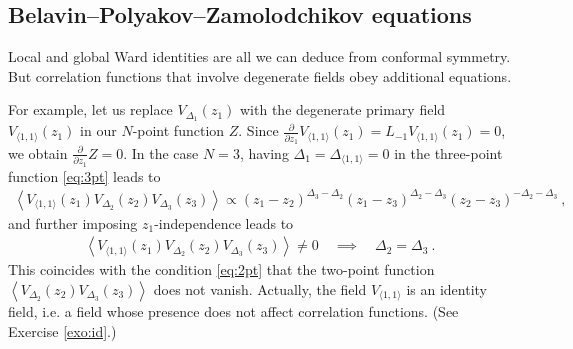 \documentclass[12pt, a4paper]{article}
\theoremstyle{break}
\begin{document}
\subsection{Belavin--Polyakov--Zamolodchikov equations}

Local and global Ward identities are all we can deduce from conformal symmetry. But correlation functions that involve degenerate fields obey additional equations. 

For example, let us replace $V_{\Delta_1}(z_1)$ with the degenerate primary field $V_{\langle 1, 1 \rangle}(z_1)$
in our $N$-point function $Z$. Since $\frac{\partial}{\partial z_1} V_{\langle 1, 1 \rangle}(z_1) = L_{-1} V_{\langle 1, 1 \rangle}(z_1) =0$,
we obtain $\frac{\partial}{\partial z_1} Z =0$. 
In the case $N=3$, having $\Delta_1=\Delta_{\langle 1,1\rangle}=0$ in the three-point function \eqref{eq:3pt} leads to
\begin{align}
 \left< V_{\langle 1, 1 \rangle}(z_1) V_{\Delta_2}(z_2) V_{\Delta_3}(z_3) \right> \propto (z_1-z_2)^{\Delta_3-\Delta_2} (z_1-z_3)^{\Delta_2-\Delta_3} (z_2-z_3)^{-\Delta_2-\Delta_3}\ , 
\end{align}
and further imposing $z_1$-independence leads to 
\begin{align}
 \left< V_{\langle 1, 1 \rangle}(z_1) V_{\Delta_2}(z_2) V_{\Delta_3}(z_3) \right> \neq 0 \quad \implies \quad \Delta_2=\Delta_3\ .
 \label{eq:vvvnz}
\end{align}
This coincides with the condition \eqref{eq:2pt} that the two-point function $\left<V_{\Delta_2}(z_2)V_{\Delta_3}(z_3)\right>$ does not vanish. Actually, the field $V_{\langle 1,1\rangle}$ is an identity field, i.e. a field whose presence does not affect correlation functions. (See Exercise \ref{exo:id}.)
\end{document}
